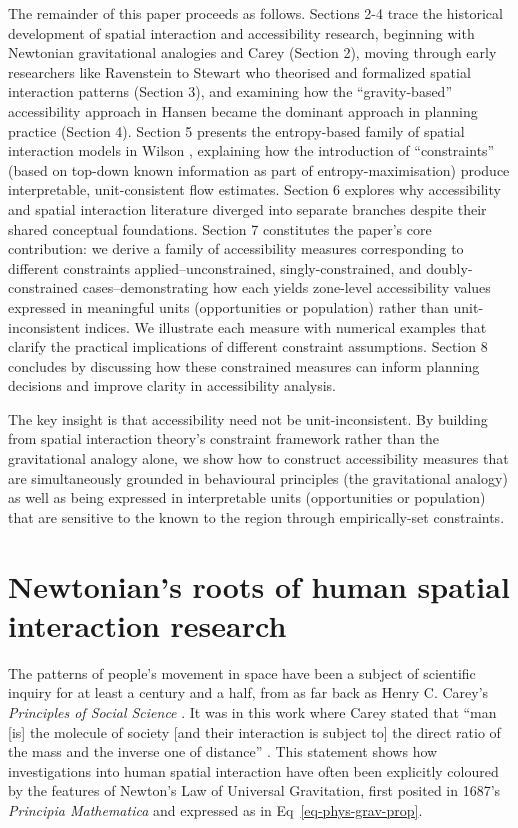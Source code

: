 \documentclass[
  10pt,
  letterpaper,
]{article}
\begin{document}
The remainder of this paper proceeds as follows. Sections 2-4 trace the
historical development of spatial interaction and accessibility
research, beginning with Newtonian gravitational analogies and Carey
\citep{careyPrinciplesSocialScience1858} (Section 2), moving through
early researchers like Ravenstein \citep{ravensteinLawsMigration1885} to
Stewart \citep{stewartDemographicGravitationEvidence1948} who theorised
and formalized spatial interaction patterns (Section 3), and examining
how the ``gravity-based'' accessibility approach in Hansen
\citep{hansen1959} became the dominant approach in planning practice
(Section 4). Section 5 presents the entropy-based family of spatial
interaction models in Wilson \citep{wilson1971}, explaining how the
introduction of ``constraints'' (based on top-down known information as
part of entropy-maximisation) produce interpretable, unit-consistent
flow estimates. Section 6 explores why accessibility and spatial
interaction literature diverged into separate branches despite their
shared conceptual foundations. Section 7 constitutes the paper's core
contribution: we derive a family of accessibility measures corresponding
to different constraints applied--unconstrained, singly-constrained, and
doubly-constrained cases--demonstrating how each yields zone-level
accessibility values expressed in meaningful units (opportunities or
population) rather than unit-inconsistent indices. We illustrate each
measure with numerical examples that clarify the practical implications
of different constraint assumptions. Section 8 concludes by discussing
how these constrained measures can inform planning decisions and improve
clarity in accessibility analysis.

The key insight is that accessibility need not be unit-inconsistent. By
building from spatial interaction theory's constraint framework rather
than the gravitational analogy alone, we show how to construct
accessibility measures that are simultaneously grounded in behavioural
principles (the gravitational analogy) as well as being expressed in
interpretable units (opportunities or population) that are sensitive to
the known to the region through empirically-set constraints.

\section{Newtonian's roots of human spatial interaction
research}\label{newtonians-roots-of-human-spatial-interaction-research}

The patterns of people's movement in space have been a subject of
scientific inquiry for at least a century and a half, from as far back
as Henry C. Carey's \emph{Principles of Social Science}
\citep{careyPrinciplesSocialScience1858}. It was in this work where
Carey stated that ``man {[}is{]} the molecule of society {[}and their
interaction is subject to{]} the direct ratio of the mass and the
inverse one of distance'' \citep[pp.~37-38]{mckeanManual1883}. This
statement shows how investigations into human spatial interaction have
often been explicitly coloured by the features of Newton's Law of
Universal Gravitation, first posited in 1687's \emph{Principia
Mathematica} and expressed as in Eq~\ref{eq-phys-grav-prop}.
\end{document}
